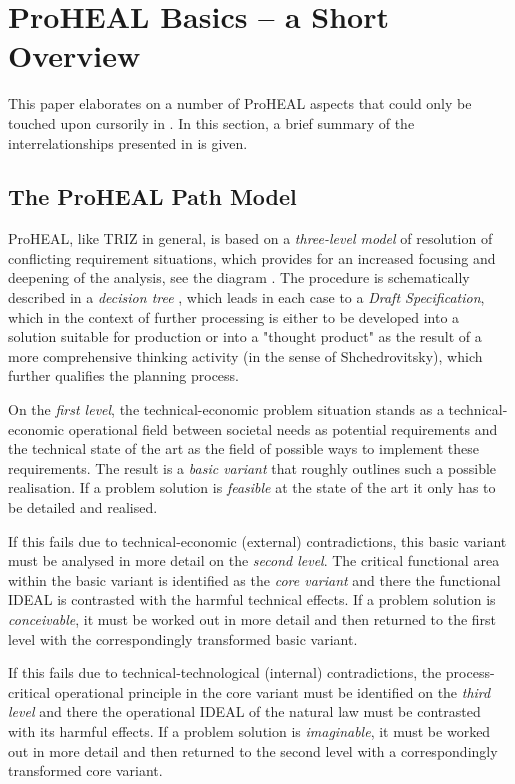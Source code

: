 \documentclass[11pt,a4paper]{article}
\begin{document}
\section{ProHEAL Basics -- a Short Overview}

This paper elaborates on a number of ProHEAL aspects that could only be
touched upon cursorily in \cite{ProHEAL-21}. In this section, a brief summary
of the interrelationships presented in \cite{ProHEAL-21} is given.

\subsection{The ProHEAL Path Model}

ProHEAL, like TRIZ in general, is based on a \emph{three-level model} of
resolution of conflicting requirement situations, which provides for an
increased focusing and deepening of the analysis, see the diagram
\cite[Appendix 1]{ProHEAL-21}. The procedure is schematically described in a
\emph{decision tree} \cite[Appendix 3]{ProHEAL-21}, which leads in each case
to a \emph{Draft Specification}, which in the context of further processing is
either to be developed into a solution suitable for production or into a
"thought product" as the result of a more comprehensive thinking activity (in
the sense of Shchedrovitsky), which further qualifies the planning process.

On the \emph{first level}, the technical-economic problem situation stands as
a technical-economic operational field between societal needs as potential
requirements and the technical state of the art as the field of possible ways
to implement these requirements. The result is a \emph{basic variant} that
roughly outlines such a possible realisation. If a problem solution is
\emph{feasible} at the state of the art it only has to be detailed and
realised.

If this fails due to technical-economic (external) contradictions, this basic
variant must be analysed in more detail on the \emph{second level}. The
critical functional area within the basic variant is identified as the
\emph{core variant} and there the functional IDEAL is contrasted with the
harmful technical effects. If a problem solution is \emph{conceivable}, it
must be worked out in more detail and then returned to the first level with
the correspondingly transformed basic variant.

If this fails due to technical-technological (internal) contradictions, the
process-critical operational principle in the core variant must be identified
on the \emph{third level} and there the operational IDEAL of the natural law
must be contrasted with its harmful effects. If a problem solution is
\emph{imaginable}, it must be worked out in more detail and then returned to
the second level with a correspondingly transformed core variant.
\end{document}
